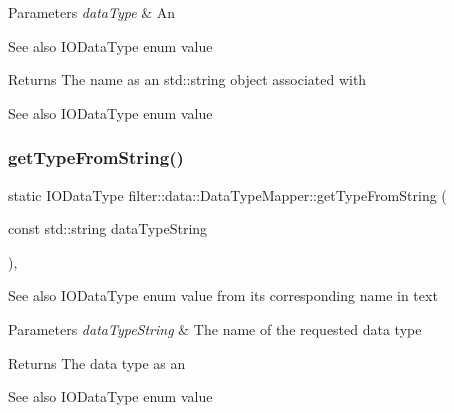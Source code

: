 \begin{DoxyParams}{Parameters}
{\em data\+Type} & An \\
\hline
\end{DoxyParams}
\begin{DoxySeeAlso}{See also}
I\+O\+Data\+Type enum value 
\end{DoxySeeAlso}
\begin{DoxyReturn}{Returns}
The name as an std\+::string object associated with 
\end{DoxyReturn}
\begin{DoxySeeAlso}{See also}
I\+O\+Data\+Type enum value 
\end{DoxySeeAlso}
\mbox{\label{classfilter_1_1data_1_1_data_type_mapper_afb0b4b71313e5ac7e681a8dc01518e8f}} 
\subsubsection{\texorpdfstring{get\+Type\+From\+String()}{getTypeFromString()}}
{\footnotesize\ttfamily static I\+O\+Data\+Type filter\+::data\+::\+Data\+Type\+Mapper\+::get\+Type\+From\+String (\begin{DoxyParamCaption}\item[{const std\+::string}]{data\+Type\+String }\end{DoxyParamCaption})\hspace{0.3cm}{\ttfamily [inline]}, {\ttfamily [static]}}

\begin{DoxySeeAlso}{See also}
I\+O\+Data\+Type enum value from its corresponding name in text 
\end{DoxySeeAlso}

\begin{DoxyParams}{Parameters}
{\em data\+Type\+String} & The name of the requested data type \\
\hline
\end{DoxyParams}
\begin{DoxyReturn}{Returns}
The data type as an 
\end{DoxyReturn}
\begin{DoxySeeAlso}{See also}
I\+O\+Data\+Type enum value 
\end{DoxySeeAlso}
\mbox{\label{classfilter_1_1data_1_1_data_type_mapper_acd18a509528e02426321f1d979be148c}} 
